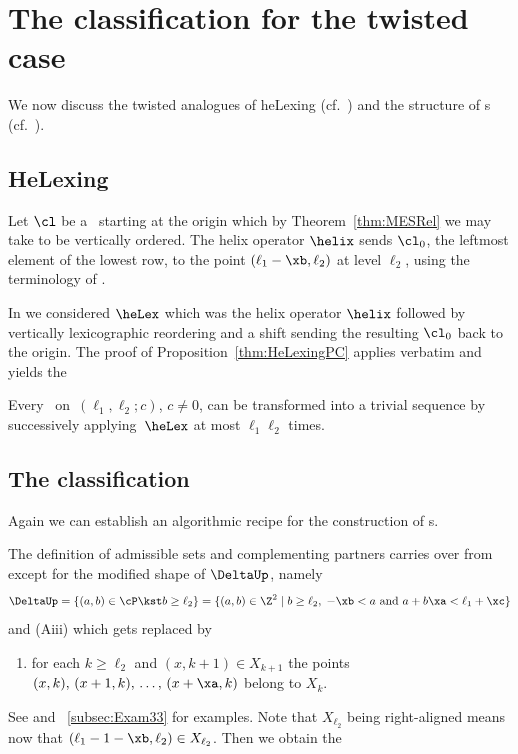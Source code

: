 \section{The classification for the twisted case}
\label{sec:completeClass}
We now discuss the twisted analogues of
heLexing (cf.\ ) and 
the structure of {\mes}s (cf.\ ).

\subsection{HeLexing}
\label{subsec:HeLexing}
{Let $\cl$ be a \mes\ starting at 
the origin which by Theorem~\ref{thm:MESRel} we may 
take to be vertically ordered.} 
The helix operator $\helix$ sends $\cl_0$, the 
leftmost element of the lowest row, to the point
$(\ell_1-\xb,\ell_2)$ at level $\ell_2$,
using the terminology of .

In  we considered
$\heLex$ which was the helix operator $\helix$ followed by 
vertically lexicographic reordering and a shift sending the 
resulting $\cl_0$ back to the origin. The proof of
Proposition~\ref{thm:HeLexingPC} applies verbatim 
and yields the

\begin{theorem}
\label{thm:HeLexing}
Every \mes\ on~$(\ell_1,\ell_2;c)$, $c\not=0$, can be 
transformed into a trivial sequence by successively applying~$\heLex$ at most $\ell_1\ell_2$ times.
\end{theorem}

\subsection{The classification}
\label{subsec:mesClassification}
Again we can establish an algorithmic recipe 
for the construction of \mes s.

The definition of admissible sets and 
complementing partners carries over from 
 except for 
{the modified shape of $\DeltaUp$, namely
$$
\DeltaUp=\{(a,b)\in\cP\kst b\geq\ell_2\}
=\{(a,b)\in\Z^2\mid b\geq\ell_2,\; -\xb<a
\mbox{ and }a+b\xa<\ell_1+\xc\}
$$
and}
(Aiii) which gets replaced by
\begin{enumerate}
\item[(Aiii')]
for each $k\geq\ell_2$ and $(x,k+1)\in X_{k+1}$ 
the points $(x,k),\,(x+1,k),\,\ldots,\,(x+\xa,k)$
belong to $X_k$.
\end{enumerate}
See  and 
~\ref{subsec:Exam33} for examples. 
{Note that $X_{\ell_2}$ being right-aligned 
means now that $(\ell_1-1-\xb,\ell_2)\in X_{\ell_2}$.}
Then we obtain the

